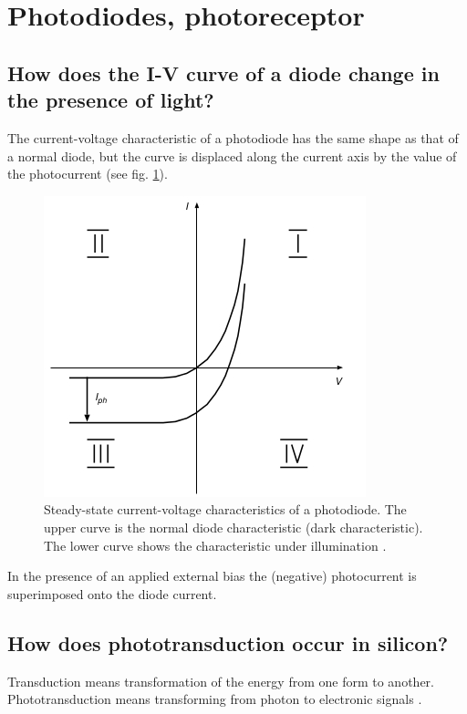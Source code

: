 \documentclass[main]{subfiles}
\begin{document}
\section{Photodiodes, photoreceptor}

\subsection{How does the I-V curve of a diode change in the presence of light?}

The current-voltage characteristic of a photodiode has the same
shape as that of a normal diode, but the curve is displaced along the current
axis by the value of the photocurrent (see fig. \ref{fig:photodiode_charac}).

\begin{figure}[htbp]
  \centering
  \includegraphics[scale=0.8]{pics/photodiode_charac.jpg}
  \caption{Steady-state current-voltage characteristics of a photodiode. The upper curve is the normal diode characteristic (dark characteristic). The lower curve shows the characteristic under illumination \cite{book:VLSI}.}
  \label{fig:photodiode_charac}
\end{figure} 

In the presence of an applied external bias the (negative) photocurrent  is superimposed onto the diode current.

\subsection{How does phototransduction occur in silicon?}

Transduction means transformation of the energy from one form to another. Phototransduction means transforming from photon to electronic signals \cite{lab8}.
\end{document}
